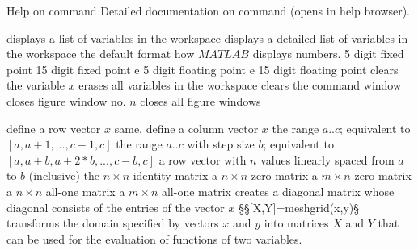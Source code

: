 

	{Help on command}
	{Detailed documentation on command (opens in help browser).}

	{displays a list of variables in the workspace}
	{displays a detailed list of variables in the workspace}
	{the default format how $MATLAB$ displays numbers.}
	{5 digit fixed point}
	{15 digit fixed point}
	{e 5 digit floating point}
	{e 15 digit floating point}
	{clears the variable $x$}
	{erases all variables in the workspace}
	{clears the command window}
	{closes figure window no. $n$}
	{closes all figure windows}

	{define a row vector $x$}
	{same.}
	{define a column vector $x$}
	{the range $a..c$; equivalent to $[a,a+1,...,c-1,c]$}
	{the range $a..c$ with step size $b$; equivalent to $[a,a+b,a+2*b,..., c-b,c]$ }
	{a row vector with $n$ values linearly spaced from $a$ to $b$ (inclusive)}
	{the $n \times n$ identity matrix}
	{a $n \times n$ zero matrix}
	{a $m \times n$ zero matrix}
	{a $n \times n$ all-one matrix}
	{a $m \times n$ all-one matrix}
	{creates a diagonal matrix whose diagonal consists of the entries of the vector $x$}
§§[X,Y]=meshgrid(x,y)§ transforms the domain specified by vectors $x$ and $y$ into matrices $X$ and $Y$ that can be used for the evaluation of functions of two variables.

